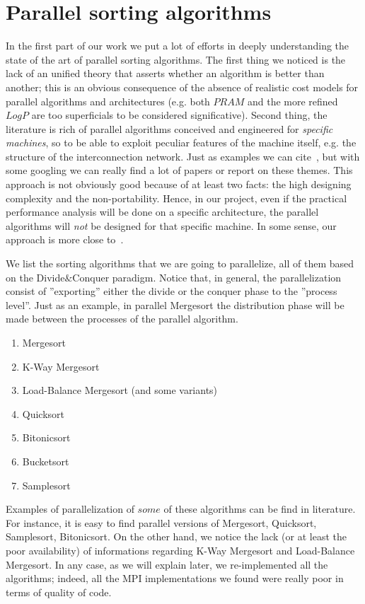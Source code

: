 \section{Parallel sorting algorithms}
In the first part of our work we put a lot of efforts in deeply understanding the state of the art of parallel sorting algorithms. The first thing we noticed is the lack of an unified theory that asserts whether an algorithm is better than another; this is an obvious consequence of the absence of realistic cost models for parallel algorithms and architectures (e.g. both $PRAM$ and the more refined $LogP$ are too superficials to be considered significative). Second thing, the literature is rich of parallel algorithms conceived and engineered for \textit{specific machines}, so to be able to exploit peculiar features of the machine itself, e.g. the structure of the interconnection network. Just as examples we can cite~\cite{CSPA, CSPA2}, but with some googling we can really find a lot of papers or report on these themes. This approach is not obviously good because of at least two facts: the high designing complexity and the non-portability. Hence, in our project, even if the practical performance analysis will be done on a specific architecture, the parallel algorithms will \textit{not} be designed for that specific machine. In some sense, our approach is more close to~\cite{NPSA}.

We list the sorting algorithms that we are going to parallelize, all of them based on the Divide$\&$Conquer paradigm. Notice that, in general, the parallelization consist of ''exporting'' either the divide or the conquer phase to the ''process level''. Just as an example, in parallel Mergesort the distribution phase will be made between the processes of the parallel algorithm. 
\begin{enumerate}
\item Mergesort
\item K-Way Mergesort
\item Load-Balance Mergesort (and some variants) 
\item Quicksort
\item Bitonicsort
\item Bucketsort
\item Samplesort
\end{enumerate}
Examples of parallelization of $some$ of these algorithms can be find in literature. For instance, it is easy to find parallel versions of Mergesort, Quicksort, Samplesort, Bitonicsort. On the other hand, we notice the lack (or at least the poor availability) of informations regarding K-Way Mergesort and Load-Balance Mergesort. In any case, as we will explain later, we re-implemented all the algorithms; indeed, all the MPI implementations we found were really poor in terms of quality of code. 
